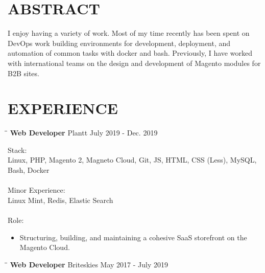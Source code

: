 \documentclass{res}
\begin{document}
\begin{resume}


\section{ABSTRACT}          
    I enjoy having a variety of work. Most of my time recently has been spent on DevOps work	building environments for development, deployment, and automation of common tasks with docker and bash. Previously, I have worked with international teams on the design and development of Magento modules for B2B sites.
 
 
\section{EXPERIENCE}
   \vspace{-0.1in}

   \begin{tabbing}
   		\hspace{2.0in}\= \hspace{2.7in}\= \kill %
    	\textbf{Web Developer} \>Plantt     \>July 2019 - Dec. 2019\\
   \end{tabbing}\vspace{-20pt}      %
   
    Stack: \\
	Linux, PHP, Magento 2, Magneto Cloud, Git, JS, HTML, CSS (Less), MySQL, Bash, Docker \\
	\\
	Minor Experience: \\
	Linux Mint, Redis, Elastic Search \\
	\\
	Role: \\
	\vspace{-0.15in}	
	\begin{itemize}
		\item Structuring, building, and maintaining a cohesive SaaS storefront on the Magento Cloud.
	\end{itemize}
   
   \begin{tabbing}
   		\hspace{2.0in}\= \hspace{2.7in}\= \kill %
    	\textbf{Web Developer} \>Briteskies     \>May 2017 - July 2019\\
   \end{tabbing}\vspace{-20pt}      %
   

\end{resume}
\end{document}
